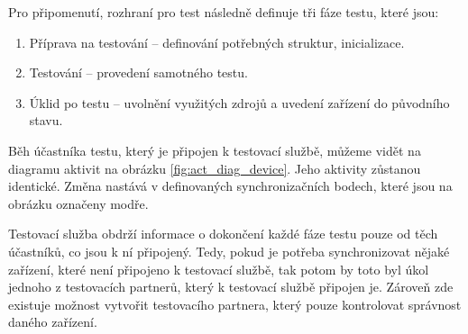 Pro připomenutí, rozhraní pro test následně definuje tři fáze testu, které jsou:

\begin{enumerate}
    \item Příprava na testování -- definování potřebných struktur, inicializace.
    \item Testování -- provedení samotného testu.
    \item Úklid po testu -- uvolnění využitých zdrojů a uvedení zařízení do původního stavu.
\end{enumerate}

Běh účastníka testu, který je připojen k testovací službě, můžeme vidět na diagramu aktivit na obrázku \ref{fig:act_diag_device}. Jeho aktivity zůstanou identické. Změna nastává v definovaných synchronizačních bodech, které jsou na obrázku označeny modře. 

Testovací služba obdrží informace o dokončení každé fáze testu pouze od těch účastníků, co jsou k ní připojený. Tedy, pokud je potřeba synchronizovat nějaké zařízení, které není připojeno k testovací službě, tak potom by toto byl úkol jednoho z testovacích partnerů, který k testovací službě připojen je. Zároveň zde existuje možnost vytvořit testovacího partnera, který pouze kontrolovat správnost daného zařízení. 

